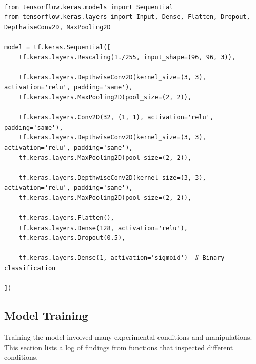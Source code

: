 \documentclass{article}
\begin{document}
\begin{tiny}
\begin{lstlisting}

from tensorflow.keras.models import Sequential
from tensorflow.keras.layers import Input, Dense, Flatten, Dropout, DepthwiseConv2D, MaxPooling2D

model = tf.keras.Sequential([
    tf.keras.layers.Rescaling(1./255, input_shape=(96, 96, 3)),

    tf.keras.layers.DepthwiseConv2D(kernel_size=(3, 3), activation='relu', padding='same'),
    tf.keras.layers.MaxPooling2D(pool_size=(2, 2)),

    tf.keras.layers.Conv2D(32, (1, 1), activation='relu', padding='same'), 
    tf.keras.layers.DepthwiseConv2D(kernel_size=(3, 3), activation='relu', padding='same'),
    tf.keras.layers.MaxPooling2D(pool_size=(2, 2)),

    tf.keras.layers.DepthwiseConv2D(kernel_size=(3, 3), activation='relu', padding='same'),
    tf.keras.layers.MaxPooling2D(pool_size=(2, 2)),

    tf.keras.layers.Flatten(),
    tf.keras.layers.Dense(128, activation='relu'),
    tf.keras.layers.Dropout(0.5),

    tf.keras.layers.Dense(1, activation='sigmoid')  # Binary classification

])

\end{lstlisting}
\end{tiny}


\subsection{Model Training} 
Training the model involved many experimental conditions and manipulations. This section lists a log of findings from functions that inspected different conditions.
\\
\end{document}
